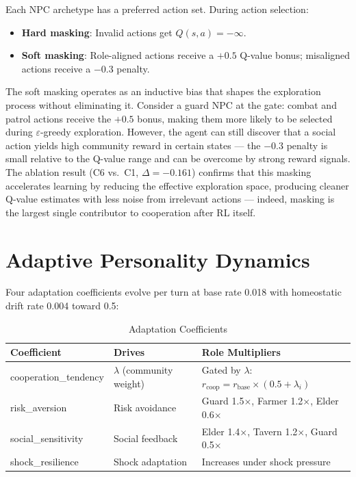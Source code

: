 \documentclass[12pt, a4paper, oneside]{report}
\begin{document}
Each NPC archetype has a preferred action set. During action selection:
\begin{itemize}[nosep]
    \item \textbf{Hard masking}: Invalid actions get $Q(s,a) = -\infty$.
    \item \textbf{Soft masking}: Role-aligned actions receive a $+0.5$ Q-value bonus; misaligned actions receive a $-0.3$ penalty.
\end{itemize}

The soft masking operates as an inductive bias that shapes the exploration process without eliminating it. Consider a guard NPC at the gate: combat and patrol actions receive the $+0.5$ bonus, making them more likely to be selected during $\varepsilon$-greedy exploration. However, the agent can still discover that a social action yields high community reward in certain states --- the $-0.3$ penalty is small relative to the Q-value range and can be overcome by strong reward signals. The ablation result (C6 vs.\ C1, $\Delta = -0.161$) confirms that this masking accelerates learning by reducing the effective exploration space, producing cleaner Q-value estimates with less noise from irrelevant actions --- indeed, masking is the largest single contributor to cooperation after RL itself.

\section{Adaptive Personality Dynamics}
\label{sec:adaptation}

Four adaptation coefficients evolve per turn at base rate 0.018 with homeostatic drift rate 0.004 toward 0.5:

\begin{table}[H]
\centering
\caption{Adaptation Coefficients}
\label{tab:adaptation}
\begin{tabular}{lll}
\toprule
\textbf{Coefficient} & \textbf{Drives} & \textbf{Role Multipliers} \\
\midrule
cooperation\_tendency & $\lambda$ (community weight) & Gated by $\lambda$: $r_{\text{coop}} = r_{\text{base}} \times (0.5 + \lambda_i)$ \\
risk\_aversion & Risk avoidance & Guard 1.5$\times$, Farmer 1.2$\times$, Elder 0.6$\times$ \\
social\_sensitivity & Social feedback & Elder 1.4$\times$, Tavern 1.2$\times$, Guard 0.5$\times$ \\
shock\_resilience & Shock adaptation & Increases under shock pressure \\
\bottomrule
\end{tabular}
\end{table}
\end{document}
